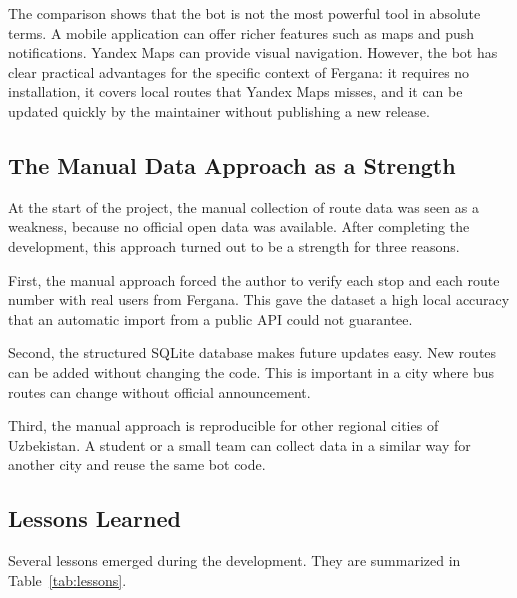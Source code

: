 The comparison shows that the bot is not the most powerful tool in absolute
terms. A mobile application can offer richer features such as maps and
push notifications. Yandex Maps can provide visual navigation. However,
the bot has clear practical advantages for the specific context of
Fergana: it requires no installation, it covers local routes that Yandex
Maps misses, and it can be updated quickly by the maintainer without
publishing a new release.

\subsection{The Manual Data Approach as a Strength}
\label{subsec:manual-data}

At the start of the project, the manual collection of route data was seen
as a weakness, because no official open data was available. After
completing the development, this approach turned out to be a strength for
three reasons.

First, the manual approach forced the author to verify each stop and each
route number with real users from Fergana. This gave the dataset a high
local accuracy that an automatic import from a public API could not
guarantee.

Second, the structured SQLite database makes future updates easy. New
routes can be added without changing the code. This is important in a
city where bus routes can change without official announcement.

Third, the manual approach is reproducible for other regional cities of
Uzbekistan. A student or a small team can collect data in a similar way
for another city and reuse the same bot code.

\subsection{Lessons Learned}
\label{subsec:lessons}

Several lessons emerged during the development. They are summarized in
Table~\ref{tab:lessons}.

